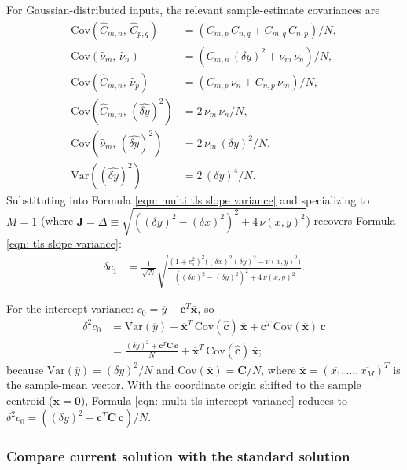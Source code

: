 \documentclass[twoside]{article}
\numberwithin{equation}{section}
\begin{document}
For Gaussian-distributed inputs, the relevant sample-estimate covariances are
\begin{align*}
\mathrm{Cov}(\hat{C}_{m,n},\, \hat{C}_{p,q}) &= (C_{m,p}\, C_{n,q} + C_{m,q}\, C_{n,p})/N, \\
\mathrm{Cov}(\hat{\nu}_m,\, \hat{\nu}_n) &= (C_{m,n}\, (\delta y)^2 + \nu_m\, \nu_n)/N, \\
\mathrm{Cov}(\hat{C}_{m,n},\, \hat{\nu}_p) &= (C_{m,p}\, \nu_n + C_{n,p}\, \nu_m)/N, \\
\mathrm{Cov}(\hat{C}_{m,n},\, (\widehat{\delta y})^2) &= 2\, \nu_m\, \nu_n/N, \\
\mathrm{Cov}(\hat{\nu}_m,\, (\widehat{\delta y})^2) &= 2\, \nu_m\, (\delta y)^2/N, \\
\mathrm{Var}((\widehat{\delta y})^2) &= 2\, (\delta y)^4/N.
\end{align*}
Substituting into Formula \eqref{eqn: multi tls slope variance} and specializing to $M = 1$ (where $\mathbf{J} = \Delta \equiv \sqrt{((\delta y)^2 - (\delta x)^2)^2 + 4\,\nu(x,y)^2}$) recovers Formula \eqref{eqn: tls slope variance}:
\begin{align}
\label{eqn: tls slope variance}
\delta c_1 &= \frac{1}{\sqrt{N}} \sqrt{ \frac{(1 + c_1^2)^2 \bigl( (\delta x)^2 (\delta y)^2 - \nu(x,y)^2 \bigr)}{((\delta x)^2 - (\delta y)^2)^2 + 4\, \nu(x,y)^2}}.
\end{align}

For the intercept variance: $c_0 = \overline{y} - \mathbf{c}^T \overline{\mathbf{x}}$, so
\begin{align}
\label{eqn: multi tls intercept variance}
\delta^2 c_0 &= \mathrm{Var}(\overline{y}) + \overline{\mathbf{x}}^T\, \mathrm{Cov}(\hat{\mathbf{c}})\, \overline{\mathbf{x}} + \mathbf{c}^T\, \mathrm{Cov}(\overline{\mathbf{x}})\, \mathbf{c} \nonumber \\
	&= \frac{(\delta y)^2 + \mathbf{c}^T \mathbf{C}\, \mathbf{c}}{N} + \overline{\mathbf{x}}^T\, \mathrm{Cov}(\hat{\mathbf{c}})\, \overline{\mathbf{x}};
\end{align}
because $\mathrm{Var}(\overline{y}) = (\delta y)^2/N$ and $\mathrm{Cov}(\overline{\mathbf{x}}) = \mathbf{C}/N$, where $\overline{\mathbf{x}} = (\overline{x_1}, \dots, \overline{x_M})^T$ is the sample-mean vector. With the coordinate origin shifted to the sample centroid ($\overline{\mathbf{x}} = \mathbf{0}$), Formula \eqref{eqn: multi tls intercept variance} reduces to $\delta^2 c_0 = ((\delta y)^2 + \mathbf{c}^T \mathbf{C}\,\mathbf{c})/N$.

\subsubsection{Compare current solution with the standard solution}
\end{document}
